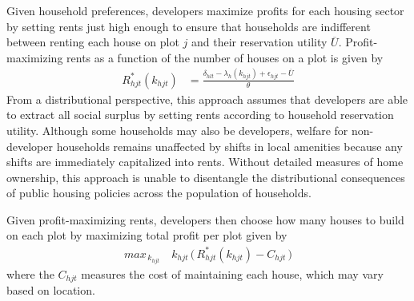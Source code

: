 \documentclass[12pt]{article}
\begin{document}
Given household preferences, developers maximize profits for each housing sector by setting rents just high enough to ensure that households are indifferent between renting each house on plot $j$ and their reservation utility $\overline{U}$.  Profit-maximizing rents as a function of the number of houses on a plot is given by
\begin{align}
\label{eq:rent}
R_{hjt}^{*}(k_{hjt}) &= \frac{ \delta_{hlt} - \lambda_{h}(k_{hjt}) + \epsilon_{hjt} - \overline{U}}{\theta}
\end{align}
From a distributional perspective, this approach assumes that developers are able to extract all social surplus by setting rents according to household reservation utility.  Although some households may also be developers, welfare for non-developer households remains unaffected by shifts in local amenities because any shifts are immediately capitalized into rents.  Without detailed measures of home ownership, this approach is unable to disentangle the distributional consequences of public housing policies across the population of households.

Given profit-maximizing rents, developers then choose how many houses to build on each plot by maximizing total profit per plot given by
\begin{align*}
max_{\,k_{hjt}} \,\,\,\,\,\,  k_{hjt} \, \Big( \, R_{hjt}^{*}(k_{hjt}) - C_{hjt} \, \Big )
\end{align*}
\noindent where the $C_{hjt}$ measures the cost of maintaining each house, which may vary based on location.

\end{document}
